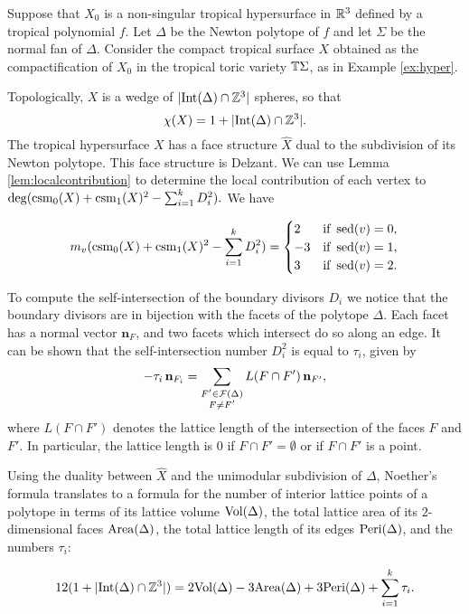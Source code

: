 \begin{exa}
Suppose that $X_0$ is a non-singular tropical hypersurface in $\mathbb{R}^3$ defined by a tropical polynomial $f$. Let $\Delta$ be the Newton polytope of $f$ and let $\Sigma$ be the normal fan of $\Delta$. Consider the compact tropical surface $X$ obtained as the compactification of $X_0$ in the tropical toric variety ${\mathbb T}\Sigma$, as in Example \ref{ex:hyper}. 

Topologically, $X$ is a wedge of $|{\rm Int}(\Delta) \cap {\mathbb Z}^3|$ spheres, so that 
$$\chi(X) = 1 + |{\rm Int}(\Delta) \cap {\mathbb Z}^3|.$$
The tropical hypersurface $X$ has a face structure $\hat{X}$ dual to the subdivision of its Newton polytope. This face structure is Delzant. 
We can use Lemma \ref{lem:localcontribution} to determine the local contribution of each vertex to $ \deg(\operatorname{csm}_0(X) + \operatorname{csm}_1(X)^2 - \sum_{i = 1}^k D_i^2).$ We have

$$
m_v(\operatorname{csm}_0(X) + \operatorname{csm}_1(X)^2 - \sum_{i = 1}^k D_i^2)= \begin{cases}
  2 & \text{if } \operatorname{sed}(v) = 0, \\
  - 3 &  \text{if } \operatorname{sed}(v) = 1, \\
3 & \text{if } \operatorname{sed}(v) = 2.  
\end{cases}$$

To compute the self-intersection of the boundary divisors $D_i$ we notice that the boundary divisors are in bijection with the facets of the polytope $\Delta$. Each facet has a normal vector ${\mathbf n}_F$, and two facets which intersect do so along an edge. 
It can be shown that the self-intersection number $D_i^2$ is equal to $\tau_i$, given by
$$- \tau_i \, {\mathbf n}_{F_i} = \sum_{\substack{F' \in {\mathcal F}(\Delta) \\ F \neq F'}} L(F \cap F') \, {\mathbf n}_{F'}, $$ where $L(F \cap F') $ denotes the lattice length of the intersection of the faces $F$ and $F'$. In particular, the lattice length is $0 $ if $F \cap F' = \emptyset$ or if $F \cap F'$ is a point.

Using the duality between $\hat{X}$ and the unimodular subdivision of $\Delta$, Noether's formula translates to a formula for the number of interior lattice points of a polytope in terms of its lattice volume $ {\rm Vol}(\Delta) $, the total lattice area of its $2$-dimensional faces ${\rm Area} (\Delta)$, the total lattice length of its edges  ${\rm Peri} (\Delta)$, and the numbers $\tau_i$:

$$12(1 + |{\rm Int}(\Delta) \cap {\mathbb Z}^3|) = 2 {\rm Vol}(\Delta) - 3 {\rm Area} (\Delta) + 3 {\rm Peri} (\Delta)   + \sum_{i = 1}^k \tau_i.$$
\end{exa}
